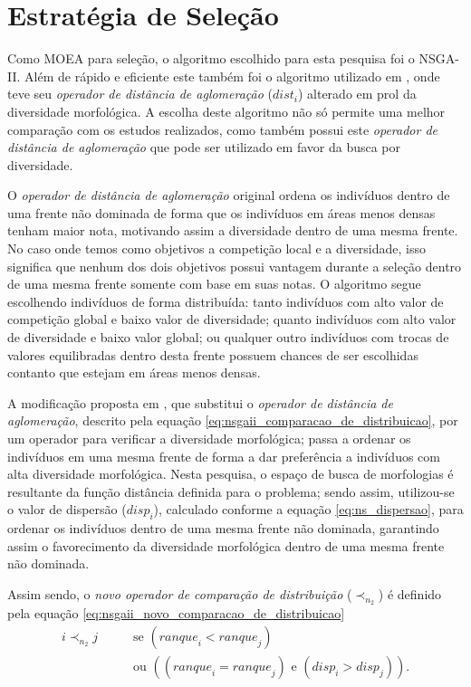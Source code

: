 \section{Estratégia de Seleção}
\label{dev_selecao}

Como MOEA para seleção, o algoritmo escolhido para esta pesquisa foi o NSGA-II. Além de rápido e eficiente este também foi o algoritmo utilizado em \cite{lehman2011evolving}, onde teve seu \emph{operador de distância de aglomeração} (${dist}_i$) alterado em prol da diversidade morfológica. A escolha deste algoritmo não só permite uma melhor comparação com os estudos realizados, como também possui este \emph{operador de distância de aglomeração} que pode ser utilizado em favor da busca por diversidade.

O \emph{operador de distância de aglomeração} original ordena os indivíduos dentro de uma frente não dominada de forma que os indivíduos em áreas menos densas tenham maior nota, motivando assim a diversidade dentro de uma mesma frente. No caso onde temos como objetivos a competição local e a diversidade, isso significa que nenhum dos dois objetivos possui vantagem durante a seleção dentro de uma mesma frente somente com base em suas notas. O algoritmo segue escolhendo indivíduos de forma distribuída: tanto indivíduos com alto valor de competição global e baixo valor de diversidade; quanto indivíduos com alto valor de diversidade e baixo valor global; ou qualquer outro indivíduos com trocas de valores equilibradas dentro desta frente possuem chances de ser escolhidas contanto que estejam em áreas menos densas.

A modificação proposta em \cite{lehman2011evolving}, que substitui o \emph{operador de distância de aglomeração}, descrito pela equação \ref{eq:nsgaii_comparacao_de_distribuicao}, por um operador para verificar a diversidade morfológica; passa a ordenar os indivíduos em uma mesma frente de forma a dar preferência a indivíduos com alta diversidade morfológica. Nesta pesquisa, o espaço de busca de morfologias é resultante da função distância definida para o problema; sendo assim, utilizou-se o valor de dispersão (${disp}_i$), calculado conforme a equação \ref{eq:ns_dispersao}, para ordenar os indivíduos dentro de uma mesma frente não dominada, garantindo assim o favorecimento da diversidade morfológica dentro de uma mesma frente não dominada.

Assim sendo, o \emph{novo operador de comparação de distribuição} ($\prec_{n_2}$) é definido pela equação \ref{eq:nsgaii_novo_comparacao_de_distribuicao}
\begin{equation}
    \begin{aligned}
        i\prec_{n_2}j & \quad \quad \text{se }({ranque}_i<{ranque}_j) \\
        & \quad \quad \text{ou } (({ranque}_i={ranque}_j) \text{ e }({disp}_i>{disp}_j)).
    \end{aligned}
    \label{eq:nsgaii_novo_comparacao_de_distribuicao}
\end{equation}


